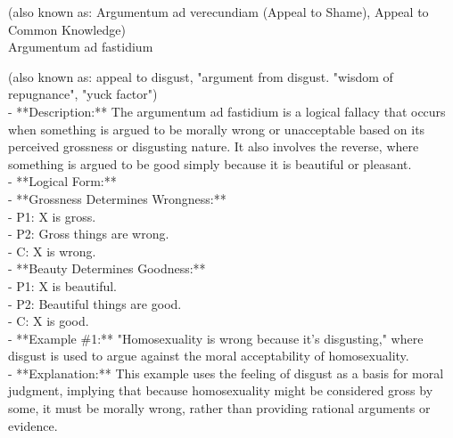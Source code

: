 \documentclass[a4paper,12pt,single,pdftex]{scrbook}
\begin{document}
  
    
      (also known as: Argumentum ad verecundiam (Appeal to Shame), Appeal to Common Knowledge)
    \\

  

Argumentum ad fastidium
    
      (also known as: appeal to disgust, "argument from disgust. "wisdom of repugnance", "yuck factor")
    \\

  
    
      - **Description:** The argumentum ad fastidium is a logical fallacy that occurs when something is argued to be morally wrong or unacceptable based on its perceived grossness or disgusting nature. It also involves the reverse, where something is argued to be good simply because it is beautiful or pleasant.
    \\

    
      - **Logical Form:**
    \\

    
        - **Grossness Determines Wrongness:**
    \\

    
          - P1: X is gross.
    \\

    
          - P2: Gross things are wrong.
    \\

    
          - C: X is wrong.
    \\

    
        - **Beauty Determines Goodness:**
    \\

    
          - P1: X is beautiful.
    \\

    
          - P2: Beautiful things are good.
    \\

    
          - C: X is good.
    \\

    
      - **Example \#1:** "Homosexuality is wrong because it's disgusting," where disgust is used to argue against the moral acceptability of homosexuality.
    \\

    
      - **Explanation:** This example uses the feeling of disgust as a basis for moral judgment, implying that because homosexuality might be considered gross by some, it must be morally wrong, rather than providing rational arguments or evidence.
    \\
\end{document}
